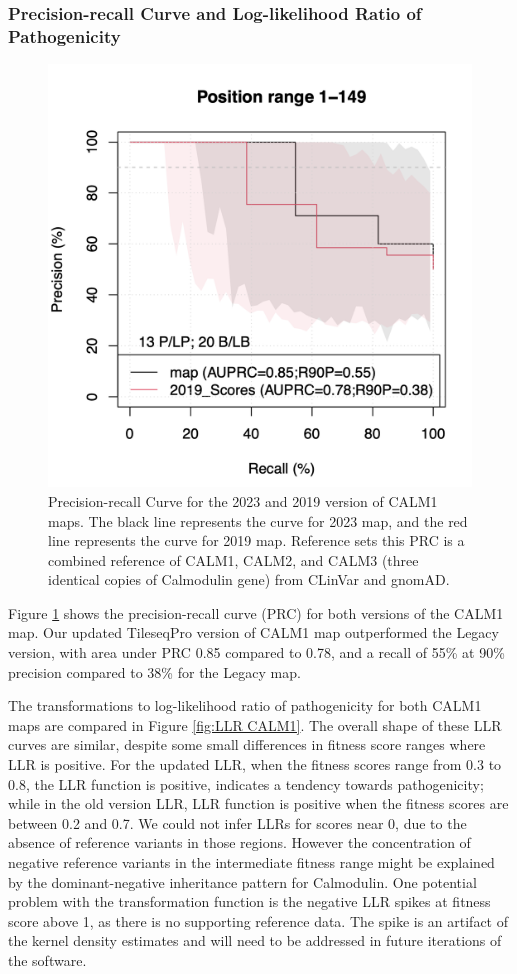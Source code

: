 \documentclass{article}
\begin{document}
\subsubsection{Precision-recall Curve and Log-likelihood Ratio of Pathogenicity}
\begin{figure}[H]
    \centering
    \includegraphics[width =.4\textwidth]{Figures/CALM1/update_PRC.png}
    \caption{Precision-recall Curve for the 2023 and 2019 version of CALM1 maps. The black line represents the curve for 2023 map, and the red line represents the curve for 2019 map. Reference sets this PRC is a combined reference of CALM1, CALM2, and CALM3 (three identical copies of Calmodulin gene) from CLinVar and gnomAD.}
    \label{fig:PRC for CALM1}
\end{figure}

Figure \ref{fig:PRC for CALM1} shows the precision-recall curve (PRC) for both versions of the CALM1 map. Our updated TileseqPro version of CALM1 map outperformed the Legacy version, with area under PRC 0.85 compared to 0.78, and a recall of 55\% at 90\% precision compared to 38\% for the Legacy map.


The transformations to log-likelihood ratio of pathogenicity for both CALM1 maps are compared in Figure \ref{fig:LLR CALM1}. The overall shape of these LLR curves are similar, despite some small differences in fitness score ranges where LLR is positive. For the updated LLR, when the fitness scores range from 0.3 to 0.8, the LLR function is positive, indicates a tendency towards pathogenicity; while in the old version LLR, LLR function is positive when the fitness scores are between 0.2 and 0.7. We could not infer LLRs for scores near 0, due to the absence of reference variants in those regions. However the concentration of negative reference variants in the intermediate fitness range might be explained by the dominant-negative inheritance pattern for Calmodulin\cite{floyd_proactive_2023}.
One potential problem with the transformation function is the negative LLR spikes at fitness score above 1, as there is no supporting reference data. The spike is an artifact of the kernel density estimates and will need to be addressed in future iterations of the software.
\end{document}
